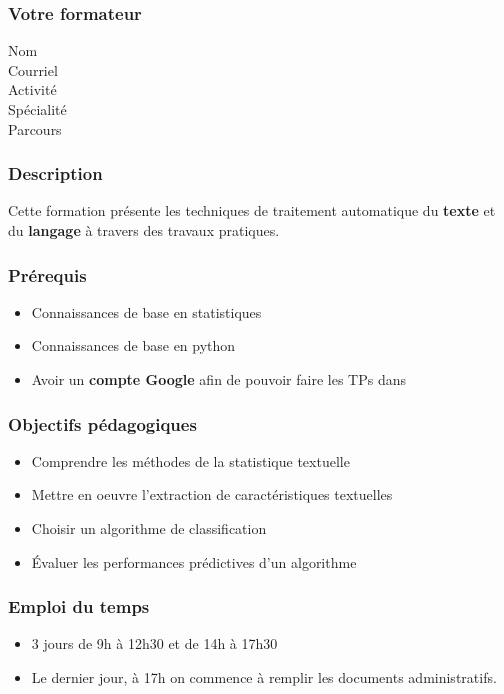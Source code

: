 \begin{frame}
  \frametitle{Votre formateur}
  \begin{description}
  \item[Nom] \TrainerName
  \item[Courriel] \TrainerEmail
  \item[Activité] \TrainerActivity
  \item[Spécialité] \TrainerSpecialization
  \item[Parcours] \TrainerTraining
  \end{description}
\end{frame}

\begin{frame}
  \frametitle{Description}
  Cette formation présente les techniques de traitement automatique du 
  \textbf{texte} et du \textbf{langage} à travers des travaux pratiques.
\end{frame}

\begin{frame}
  \frametitle{Prérequis}
  \begin{itemize}
  \item Connaissances de base en statistiques
  \item Connaissances de base en python
  \item Avoir un \textbf{compte Google} afin de pouvoir faire les TPs dans 
  \end{itemize}
\end{frame}

\begin{frame}
  \frametitle{Objectifs pédagogiques}
  \begin{itemize}
  \item Comprendre les méthodes de la statistique textuelle
  \item Mettre en oeuvre l'extraction de caractéristiques textuelles
  \item Choisir un algorithme de classification
  \item Évaluer les performances prédictives d'un algorithme
  \end{itemize}
\end{frame}

\begin{frame}
  \frametitle{Emploi du temps}
  \begin{itemize}
  \item 3 jours de 9h à 12h30 et de 14h à 17h30
  \item Le dernier jour, à 17h on commence à remplir les documents administratifs.
  \end{itemize}
\end{frame}

